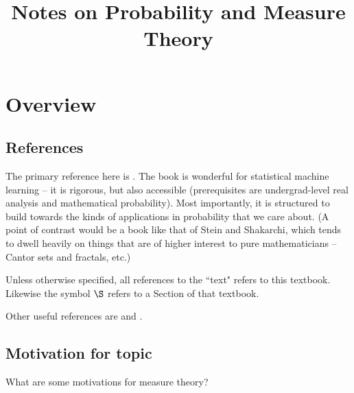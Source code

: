 \documentclass{article} %
\begin{document}
\title{Notes on Probability and Measure Theory} 
\maketitle
\setcounter{tocdepth}{2}
\tableofcontents
\newpage 

\section{Overview}

\subsection{References}
The primary reference here is \cite{ash2000probability}.   The book is wonderful for statistical machine learning – it is rigorous,  but also accessible (prerequisites are undergrad-level real analysis and mathematical probability).  Most importantly, it is structured to build towards the kinds of applications in probability that we care about.   (A point of contrast would be a book like that of Stein and Shakarchi, which tends to dwell heavily on things that are of higher interest to pure mathematicians – Cantor sets and fractals, etc.) 

 Unless otherwise specified, all references to the ``text" refers to this textbook.  Likewise the symbol $\S$ refers to a Section of that textbook.
 
 Other useful references are \cite{folland1999real} and \cite{rudin1987real}. 
 
\subsection{Motivation for topic} \label{sec:motivation_for_topic}

What are some motivations for measure theory?
\end{document}
